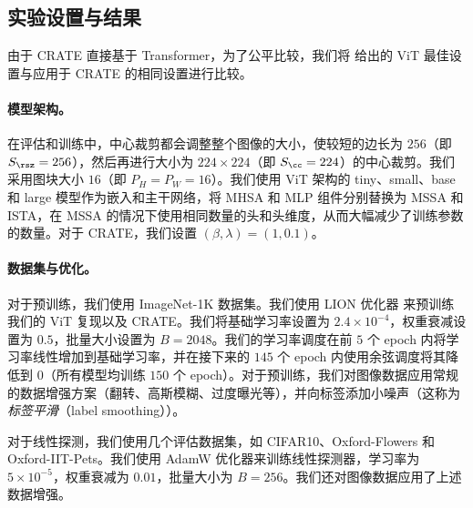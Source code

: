\documentclass[../../book-main_zh.tex]{subfiles}
\begin{document}
\subsection{实验设置与结果}\label{sub:image_classification_experiments}

由于 CRATE 直接基于 Transformer，为了公平比较，我们将 \cite{dosovitskiy2020image,touvron2020training} 给出的 ViT 最佳设置与应用于 CRATE 的相同设置进行比较。

\paragraph{模型架构。} 在评估和训练中，中心裁剪都会调整整个图像的大小，使较短的边长为 \(256\)（即 \(S_{\rsz} = 256\)），然后再进行大小为 \(224 \times 224\)（即 \(S_{\cc} = 224\)）的中心裁剪。我们采用图块大小 \(16\)（即 \(P_{H} = P_{W} = 16\)）。我们使用 ViT \cite{dosovitskiy2020image} 架构的 tiny、small、base 和 large 模型作为嵌入和主干网络，将 MHSA 和 MLP 组件分别替换为 MSSA 和 ISTA，在 MSSA 的情况下使用相同数量的头和头维度，从而大幅减少了训练参数的数量。对于 CRATE，我们设置 \((\beta, \lambda) = (1, 0.1)\)。

\paragraph{数据集与优化。} 对于预训练，我们使用 ImageNet-1K 数据集。我们使用 LION 优化器 \citep{chen2024symbolic} 来预训练我们的 ViT 复现以及 CRATE。我们将基础学习率设置为 \(2.4 \times
10^{-4}\)，权重衰减设置为 \(0.5\)，批量大小设置为 \(B = 2048\)。我们的学习率调度在前 \(5\) 个 epoch 内将学习率线性增加到基础学习率，并在接下来的 \(145\) 个 epoch 内使用余弦调度将其降低到 \(0\)（所有模型均训练 \(150\) 个 epoch）。对于预训练，我们对图像数据应用常规的数据增强方案（翻转、高斯模糊、过度曝光等），并向标签添加小噪声（这称为\textit{标签平滑}（label smoothing）\citep{muller2019does}）。

对于线性探测，我们使用几个评估数据集，如 CIFAR10、Oxford-Flowers 和 Oxford-IIT-Pets。我们使用 AdamW 优化器来训练线性探测器，学习率为 \(5 \times
10^{-5}\)，权重衰减为 \(0.01\)，批量大小为 \(B = 256\)。我们还对图像数据应用了上述数据增强。
\end{document}
